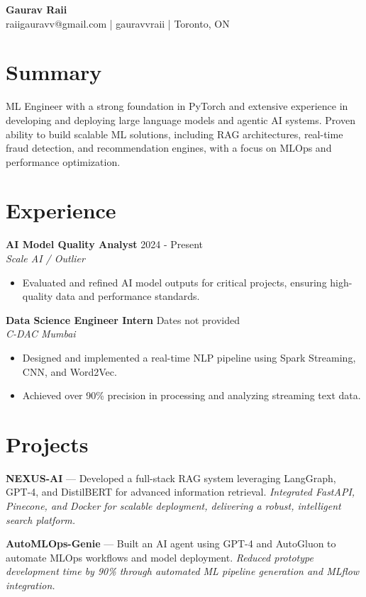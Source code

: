 \documentclass[10.5pt,letterpaper]{article}
\begin{document}
\begin{center}
  {\LARGE\textbf{Gaurav Raii}} \\[4pt]
  raiigauravv@gmail.com | gauravvraii | Toronto, ON
\end{center}

\section{Summary}
ML Engineer with a strong foundation in PyTorch and extensive experience in developing and deploying large language models and agentic AI systems. Proven ability to build scalable ML solutions, including RAG architectures, real-time fraud detection, and recommendation engines, with a focus on MLOps and performance optimization.

\section{Experience}

\textbf{AI Model Quality Analyst} \hfill 2024 - Present \\
\textit{Scale AI / Outlier}
\begin{itemize}
  \item Evaluated and refined AI model outputs for critical projects, ensuring high-quality data and performance standards.
\end{itemize}


\textbf{Data Science Engineer Intern} \hfill Dates not provided \\
\textit{C-DAC Mumbai}
\begin{itemize}
  \item Designed and implemented a real-time NLP pipeline using Spark Streaming, CNN, and Word2Vec.
  \item Achieved over 90\% precision in processing and analyzing streaming text data.
\end{itemize}


\section{Projects}
\textbf{NEXUS-AI} — Developed a full-stack RAG system leveraging LangGraph, GPT-4, and DistilBERT for advanced information retrieval. \textit{Integrated FastAPI, Pinecone, and Docker for scalable deployment, delivering a robust, intelligent search platform.}

\textbf{AutoMLOps-Genie} — Built an AI agent using GPT-4 and AutoGluon to automate MLOps workflows and model deployment. \textit{Reduced prototype development time by 90\% through automated ML pipeline generation and MLflow integration.}
\end{document}
